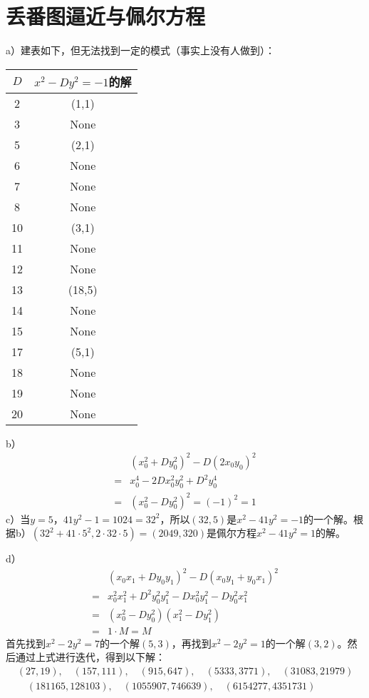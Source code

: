 \chapter{丢番图逼近与佩尔方程}
\exercise a）建表如下，但无法找到一定的模式（事实上没有人做到）：
\begin{center}
\begin{tabular}{c|c}
$D$ & $x^2-Dy^2=-1$的解 \\
\hline
2 & (1,1) \\
3 & None \\
5 & (2,1) \\
6 & None \\
7 & None \\
8 & None \\
10 & (3,1) \\
11 & None \\
12 & None \\
13 & (18,5) \\
14 & None \\
15 & None \\
17 & (5,1) \\
18 & None \\
19 & None \\
20 & None \\
\end{tabular}
\end{center}
b）
\begin{align*}
&(x_0^2+Dy_0^2)^2-D(2x_0y_0)^2 \\
=&x_0^4-2Dx_0^2y_0^2 + D^2y_0^4 \\
=&(x_0^2-Dy_0^2)^2=(-1)^2=1
\end{align*}
c）当$y=5$，$41y^2-1=1024=32^2$，所以$(32,5)$是$x^2-41y^2=-1$的一个解。根据b）$(32^2+41\cdot5^2,2\cdot32\cdot5)=(2049,320)$是佩尔方程$x^2-41y^2=1$的解。\par
d）
\begin{align*}
&(x_0x_1+Dy_0y_1)^2 - D(x_0y_1+y_0x_1)^2 \\
=&x_0^2x_1^2+D^2y_0^2y_1^2 -Dx_0^2y_1^2-Dy_0^2x_1^2 \\
=&(x_0^2-Dy_0^2)(x_1^2-Dy_1^2) \\
=&1\cdot M=M
\end{align*}
首先找到$x^2-2y^2=7$的一个解$(5,3)$，再找到$x^2-2y^2=1$的一个解$(3,2)$。然后通过上式进行迭代，得到以下解：
\begin{gather*}
(27, 19),\quad (157, 111),\quad (915, 647),\quad (5333, 3771),\quad (31083, 21979) \\
\quad (181165, 128103),\quad (1055907, 746639),\quad (6154277, 4351731)
\end{gather*}
